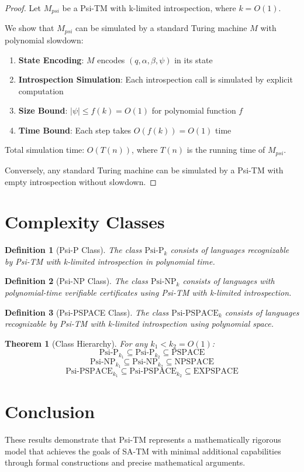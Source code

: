 \documentclass[11pt]{article}
\newtheorem{definition}{Definition}
\newtheorem{theorem}{Theorem}
\begin{document}
\begin{proof}
Let $M_{psi}$ be a Psi-TM with k-limited introspection, where $k = O(1)$.

We show that $M_{psi}$ can be simulated by a standard Turing machine $M$ with polynomial slowdown:

\begin{enumerate}
\item \textbf{State Encoding}: $M$ encodes $(q, \alpha, \beta, \psi)$ in its state
\item \textbf{Introspection Simulation}: Each introspection call is simulated by explicit computation
\item \textbf{Size Bound}: $|\psi| \leq f(k) = O(1)$ for polynomial function $f$
\item \textbf{Time Bound}: Each step takes $O(f(k)) = O(1)$ time
\end{enumerate}

Total simulation time: $O(T(n))$, where $T(n)$ is the running time of $M_{psi}$.

Conversely, any standard Turing machine can be simulated by a Psi-TM with empty introspection without slowdown.
\end{proof}

\section{Complexity Classes}

\begin{definition}[Psi-P Class]
The class $\text{Psi-P}_k$ consists of languages recognizable by Psi-TM with k-limited introspection in polynomial time.
\end{definition}

\begin{definition}[Psi-NP Class]
The class $\text{Psi-NP}_k$ consists of languages with polynomial-time verifiable certificates using Psi-TM with k-limited introspection.
\end{definition}

\begin{definition}[Psi-PSPACE Class]
The class $\text{Psi-PSPACE}_k$ consists of languages recognizable by Psi-TM with k-limited introspection using polynomial space.
\end{definition}

\begin{theorem}[Class Hierarchy]
For any $k_1 < k_2 = O(1)$:
$$\text{Psi-P}_{k_1} \subseteq \text{Psi-P}_{k_2} \subseteq \text{PSPACE}$$
$$\text{Psi-NP}_{k_1} \subseteq \text{Psi-NP}_{k_2} \subseteq \text{NPSPACE}$$
$$\text{Psi-PSPACE}_{k_1} \subseteq \text{Psi-PSPACE}_{k_2} \subseteq \text{EXPSPACE}$$
\end{theorem}

\section{Conclusion}

These results demonstrate that Psi-TM represents a mathematically rigorous model that achieves the goals of SA-TM with minimal additional capabilities through formal constructions and precise mathematical arguments.
\end{document}
